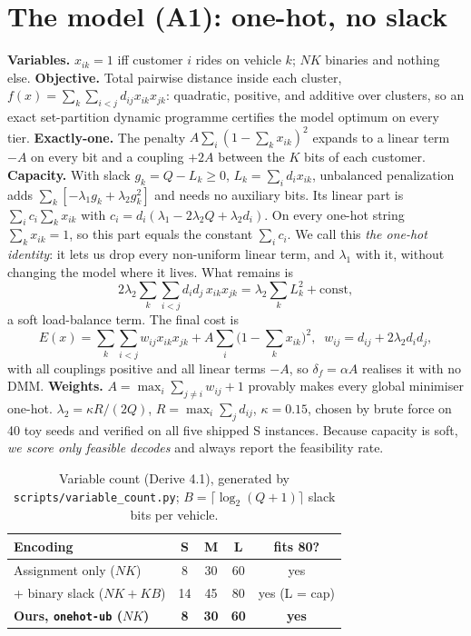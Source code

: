 \documentclass[9pt,twocolumn]{extarticle}
\newcommand{\code}[1]{\texttt{\small #1}}
\begin{document}
\section{The model (A1): one-hot, no slack}\label{sec:model}
\textbf{Variables.} $x_{ik}=1$ iff customer $i$ rides on vehicle $k$; $NK$ binaries and nothing else.
\textbf{Objective.} Total pairwise distance inside each cluster, $f(x)=\sum_k\sum_{i<j}d_{ij}x_{ik}x_{jk}$: quadratic, positive, and additive over clusters, so an exact set-partition dynamic programme certifies the model optimum on every tier.
\textbf{Exactly-one.} The penalty $A\sum_i(1-\sum_kx_{ik})^2$ expands to a linear term $-A$ on every bit and a coupling $+2A$ between the $K$ bits of each customer.
\textbf{Capacity.} With slack $g_k=Q-L_k\ge0$, $L_k=\sum_id_ix_{ik}$, unbalanced penalization \cite{montanez} adds $\sum_k[-\lambda_1g_k+\lambda_2g_k^2]$ and needs no auxiliary bits. Its linear part is $\sum_ic_i\sum_kx_{ik}$ with $c_i=d_i(\lambda_1-2\lambda_2Q+\lambda_2d_i)$. On every one-hot string $\sum_kx_{ik}=1$, so this part equals the constant $\sum_ic_i$. We call this \emph{the one-hot identity}: it lets us drop every non-uniform linear term, and $\lambda_1$ with it, without changing the model where it lives. What remains is
\begin{equation}
2\lambda_2\sum_k\sum_{i<j}d_id_j\,x_{ik}x_{jk}=\lambda_2\sum_kL_k^2+\text{const},
\end{equation}
a soft load-balance term. The final cost is
\begin{equation}
E(x)=\sum_k\sum_{i<j}w_{ij}x_{ik}x_{jk}+A\sum_i\Big(1-\sum_kx_{ik}\Big)^2,\;\; w_{ij}=d_{ij}+2\lambda_2d_id_j ,
\end{equation}
with all couplings positive and all linear terms $-A$, so $\delta_f=\alpha A$ realises it with no DMM.
\textbf{Weights.} $A=\max_i\sum_{j\ne i}w_{ij}+1$ provably makes every global minimiser one-hot. $\lambda_2=\kappa R/(2Q)$, $R=\max_i\sum_jd_{ij}$, $\kappa=0.15$, chosen by brute force on 40 toy seeds and verified on all five shipped S instances. Because capacity is soft, \emph{we score only feasible decodes} and always report the feasibility rate.

\begin{table}[t]\centering\small
\caption{Variable count (Derive 4.1), generated by \code{scripts/variable\_count.py}; $B=\lceil\log_2(Q{+}1)\rceil$ slack bits per vehicle.}
\begin{tabular}{@{}lcccc@{}}\toprule
Encoding & S & M & L & fits 80? \\\midrule
Assignment only ($NK$) & 8 & 30 & 60 & yes \\
+ binary slack ($NK+KB$) & 14 & 45 & 80 & yes (L = cap) \\
\textbf{Ours, \code{onehot-ub} ($NK$)} & \textbf{8} & \textbf{30} & \textbf{60} & \textbf{yes} \\\bottomrule
\end{tabular}
\label{tab:vars}
\end{table}
\end{document}
